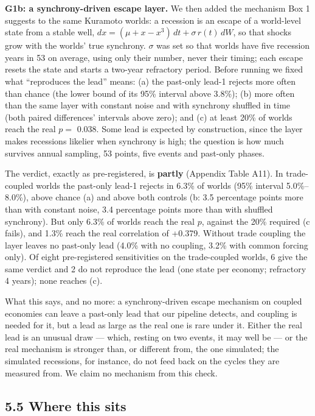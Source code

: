 \documentclass[11pt,a4paper]{article}
\newcounter{none}                    %
\begin{document}
\textbf{G1b: a synchrony-driven escape layer.} We then added the mechanism Box 1 suggests to the same Kuramoto worlds: a recession is an escape of a world-level state from a stable well, \(dx = (\mu + x - x^3)\,dt + \sigma\,r(t)\,dW\), so that shocks grow with the worlds' true synchrony. \(\sigma\) was set so that worlds have five recession years in 53 on average, using only their number, never their timing; each escape resets the state and starts a two-year refractory period. Before running we fixed what ``reproduces the lead'' means: (a) the past-only lead-1 rejects more often than chance (the lower bound of its 95\% interval above 3.8\%); (b) more often than the same layer with constant noise and with synchrony shuffled in time (both paired differences' intervals above zero); and (c) at least 20\% of worlds reach the real \(p =\) 0.038. Some lead is expected by construction, since the layer makes recessions likelier when synchrony is high; the question is how much survives annual sampling, 53 points, five events and past-only phases.

The verdict, exactly as pre-registered, is \textbf{partly} (Appendix Table A11). In trade-coupled worlds the past-only lead-1 rejects in 6.3\% of worlds (95\% interval 5.0\%–8.0\%), above chance (a) and above both controls (b: 3.5 percentage points more than with constant noise, 3.4 percentage points more than with shuffled synchrony). But only 6.3\% of worlds reach the real \(p\), against the 20\% required (c fails), and 1.3\% reach the real correlation of +0.379. Without trade coupling the layer leaves no past-only lead (4.0\% with no coupling, 3.2\% with common forcing only). Of eight pre-registered sensitivities on the trade-coupled worlds, 6 give the same verdict and 2 do not reproduce the lead (one state per economy; refractory 4 years); none reaches (c).

What this says, and no more: a synchrony-driven escape mechanism on coupled economies can leave a past-only lead that our pipeline detects, and coupling is needed for it, but a lead as large as the real one is rare under it. Either the real lead is an unusual draw — which, resting on two events, it may well be — or the real mechanism is stronger than, or different from, the one simulated; the simulated recessions, for instance, do not feed back on the cycles they are measured from. We claim no mechanism from this check.

\subsection{5.5 Where this sits}\label{where-this-sits}
\end{document}
